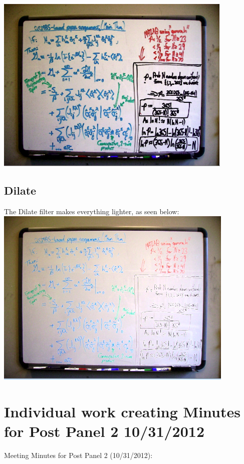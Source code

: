 \documentclass[]{article}
\begin{document}
			\includegraphics{images/erodeSmall2.png} \\
		
		\subsection{Dilate}
			The Dilate filter makes everything lighter, as seen below:\\

			\includegraphics{images/dilateSmall.png} \\

	
	\section{Individual work creating Minutes for Post Panel 2 10/31/2012}
	
		\noindent Meeting Minutes for Post Panel 2 (10/31/2012):
		
\end{document}
